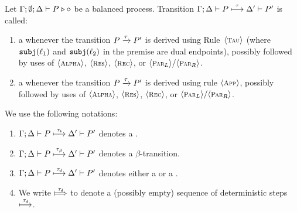 \begin{definition}
\label{def:dettrans}
	Let  $\Gamma; \emptyset; \Delta \vdash P \triangleright \diamond$ be a balanced \HOp process. 
	Transition $\Gamma; \Delta \vdash P \stackrel{\tau}{\longmapsto} \Delta' \vdash P'$ is called:
%
	\begin{enumerate}[$-$]
		\item 
				a {\em \sesstran} whenever the   transition $P \xrightarrow{\tau} P'$ 
				is derived using Rule~${\langle \text{\footnotesize \textsc{Tau}} \rangle}$ 
				(where $\mathtt{subj}(\ell_1)$ and $\mathtt{subj}(\ell_2)$ in the premise are dual endpoints), 
				possibly followed by uses of  ${\langle \text{\footnotesize \textsc{Alpha}} \rangle}$, ${\langle \text{\footnotesize \textsc{Res}} \rangle}$, ${\langle \text{\footnotesize \textsc{Rec}} \rangle}$, or ${\langle \text{\footnotesize \textsc{Par${}_L$}} \rangle}/
				{\langle \text{\footnotesize \textsc{Par${}_R$}} \rangle}$.

		
		\item
				a {\em \betatran} whenever the transition $P \xrightarrow{\tau} P'$
				is derived using rule ${\langle \text{\footnotesize \textsc{App}} \rangle}$,
				possibly followed by uses of  ${\langle \text{\footnotesize \textsc{Alpha}} \rangle}$, ${\langle \text{\footnotesize \textsc{Res}} \rangle}$, ${\langle \text{\footnotesize \textsc{Rec}} \rangle}$, or ${\langle \text{\footnotesize \textsc{Par${}_L$}} \rangle}/
				{\langle \text{\footnotesize \textsc{Par${}_R$}} \rangle}$.


	\end{enumerate}
%
\end{definition}

\begin{notation} We use the following notations:
	\begin{enumerate}[$-$]
		\item 	 $\Gamma; \Delta \vdash P \stackrel{\tau_{\mathsf{s}}}{\longmapsto} \Delta' \vdash P'$  denotes a \sesstran.
		
		\item  $\Gamma; \Delta \vdash P \stackrel{\tau_{\beta}}{\longmapsto} \Delta' \vdash P'$   denotes a $\beta$-transition.

		\item	 $\Gamma; \Delta \vdash P \stackrel{\tau_{\mathsf{d}}}{\longmapsto} \Delta' \vdash P'$   denotes
				either a \sesstran or a \betatran.
\item  We write $\Hby{\dtau}$ to denote a (possibly empty) sequence of deterministic steps $\stackrel{\tau_{\mathsf{d}}}{\longmapsto}$.
	\end{enumerate}
\end{notation}


